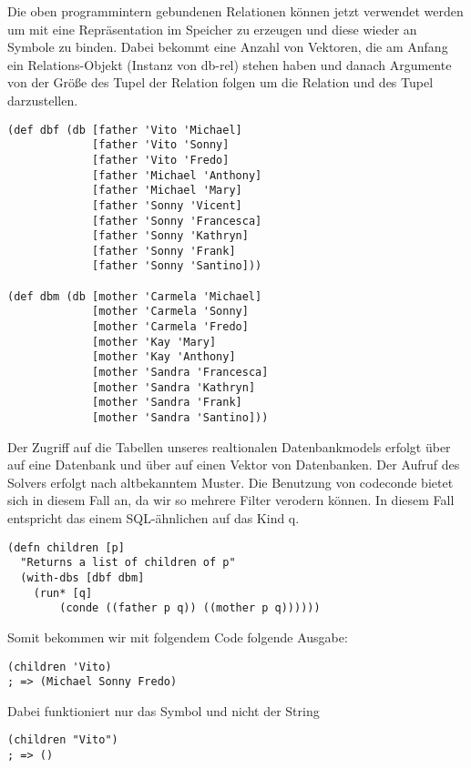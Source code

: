 Die oben programmintern gebundenen Relationen können jetzt verwendet werden um mit  eine Repräsentation im Speicher zu erzeugen und diese wieder an Symbole zu binden. Dabei bekommt  eine Anzahl von Vektoren, die am Anfang ein Relations-Objekt (\dq{}Instanz\dq{} von db-rel) stehen haben und danach Argumente von der Größe des Tupel der Relation folgen um die Relation und des Tupel darzustellen.

\begin{lstlisting}
(def dbf (db [father 'Vito 'Michael]
             [father 'Vito 'Sonny]
             [father 'Vito 'Fredo]
             [father 'Michael 'Anthony]
             [father 'Michael 'Mary]
             [father 'Sonny 'Vicent]
             [father 'Sonny 'Francesca]
             [father 'Sonny 'Kathryn]
             [father 'Sonny 'Frank]
             [father 'Sonny 'Santino]))
 
(def dbm (db [mother 'Carmela 'Michael]
             [mother 'Carmela 'Sonny]
             [mother 'Carmela 'Fredo]
             [mother 'Kay 'Mary]
             [mother 'Kay 'Anthony]
             [mother 'Sandra 'Francesca]
             [mother 'Sandra 'Kathryn]
             [mother 'Sandra 'Frank]
             [mother 'Sandra 'Santino]))
\end{lstlisting}

Der Zugriff auf die Tabellen unseres realtionalen Datenbankmodels erfolgt über  auf eine Datenbank und über  auf einen Vektor von Datenbanken. Der Aufruf des Solvers erfolgt nach altbekanntem Muster. Die Benutzung von code{conde} bietet sich in diesem Fall an, da wir so mehrere Filter verodern können. In diesem Fall entspricht das einem SQL-ähnlichen  auf das Kind q.

\begin{lstlisting}
(defn children [p] 
  "Returns a list of children of p"
  (with-dbs [dbf dbm] 
	(run* [q] 
		(conde ((father p q)) ((mother p q))))))
\end{lstlisting}

Somit bekommen wir mit folgendem Code folgende Ausgabe:

\begin{lstlisting}
(children 'Vito)
; => (Michael Sonny Fredo)
\end{lstlisting}

Dabei funktioniert nur das Symbol  und nicht der String 

\begin{lstlisting}
(children "Vito")
; => ()
\end{lstlisting}

